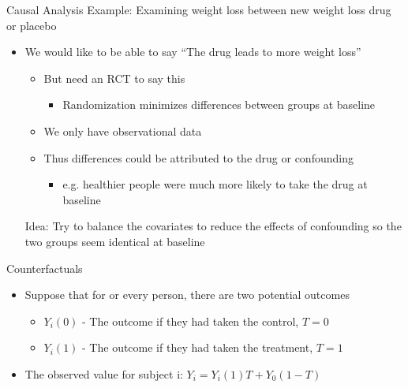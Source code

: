 \begin{frame}{Causal Analysis}
Example: Examining weight loss between new weight loss drug or placebo
 \begin{itemize}
  \item We would like to be able to say ``The drug leads to more weight loss''
  \begin{itemize}
   \item But need an RCT to say this
   \begin{itemize}
    \item Randomization minimizes differences between groups at baseline
   \end{itemize}

   \item We only have observational data
   \item Thus differences could be attributed to the drug or confounding
   
   \begin{itemize}
    \item e.g. healthier people were much more likely to take the drug at baseline
   \end{itemize}

  \end{itemize}
Idea: Try to balance the covariates to reduce the effects of confounding
so the two groups seem identical at baseline
 \end{itemize}
\end{frame}

\begin{frame}{Counterfactuals}
\begin{itemize}
 \item Suppose that for or every person, there are two potential outcomes
 \begin{itemize}
  \item $Y_i(0)$ - The outcome if they had taken the control, $T=0$
  \item $Y_i(1)$ - The outcome if they had taken the treatment, $T=1$
 \end{itemize}
 \item The observed value for subject i: $Y_i=Y_i(1)T+Y_0(1-T)$
  \end{itemize}
\end{frame}




